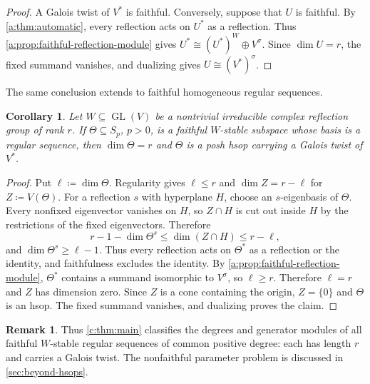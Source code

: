 \documentclass[11pt]{amsart}
\newcommand{\defeq}{\coloneqq}
\newtheorem{corollary}[theorem]{Corollary}
\theoremstyle{definition}
\newtheorem{remark}[theorem]{Remark}
\begin{document}
\faithfulhsoplemma*

\begin{proof}
A Galois twist of $V^*$ is faithful. Conversely, suppose that $U$ is
faithful. By \cref{a:thm:automatic}, every reflection acts on $U^*$ as a
reflection. Thus \cref{a:prop:faithful-reflection-module} gives
$U^*\cong (U^*)^W\oplus V^\sigma$. Since $\dim U=r$, the fixed
summand vanishes, and dualizing gives $U\cong(V^*)^\sigma$.
\end{proof}

The same conclusion extends to faithful homogeneous regular sequences.
\begin{corollary}\label{a:cor:faithful-partial-sequence}
Let $W\subseteq\operatorname{GL}(V)$ be a nontrivial irreducible complex
reflection group of rank $r$. If $\Theta\subseteq S_p$, $p>0$, is a
faithful $W$-stable subspace whose basis is a regular sequence, then
$\dim\Theta=r$ and $\Theta$ is a posh hsop carrying a Galois
twist of $V^*$.
\end{corollary}
\begin{proof}
Put $\ell\defeq\dim\Theta$. Regularity gives $\ell\le r$ and
$\dim Z=r-\ell$ for $Z\defeq V(\Theta)$. For a reflection $s$
with hyperplane $H$, choose an
$s$-eigenbasis of $\Theta$. Every nonfixed eigenvector vanishes on $H$, so
$Z\cap H$ is cut out inside $H$ by the restrictions of the fixed
eigenvectors. Therefore
\[
 r-1-\dim\Theta^s\leq\dim(Z\cap H)\leq r-\ell,
\]
and $\dim\Theta^s\geq\ell-1$. Thus every reflection acts on $\Theta^*$ as a reflection or
the identity, and faithfulness excludes the identity. By
\cref{a:prop:faithful-reflection-module}, $\Theta^*$ contains a summand
isomorphic to $V^\sigma$, so $\ell\geq r$. Therefore $\ell=r$ and $Z$
has dimension zero. Since $Z$ is a cone containing the origin,
$Z=\{0\}$ and $\Theta$ is an hsop. The fixed summand vanishes, and
dualizing proves the claim.
\end{proof}

\begin{remark}\label{rem:faithful-scope}
Thus \cref{c:thm:main} classifies the degrees and generator modules
of all faithful $W$-stable regular sequences of common positive degree:
each has length $r$ and carries a Galois twist.
The nonfaithful parameter problem is discussed in
\cref{sec:beyond-hsops}.
\end{remark}
\end{document}
